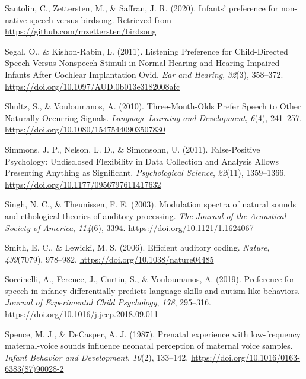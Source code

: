 \documentclass[man]{apa6}
\begin{document}
\leavevmode\hypertarget{ref-santolin_infants_2020}{}%
Santolin, C., Zettersten, M., \& Saffran, J. R. (2020). Infants' preference for non-native speech versus birdsong. Retrieved from \url{https://github.com/mzettersten/birdsong}

\leavevmode\hypertarget{ref-segal_listening_2011}{}%
Segal, O., \& Kishon-Rabin, L. (2011). Listening Preference for Child-Directed Speech Versus Nonspeech Stimuli in Normal-Hearing and Hearing-Impaired Infants After Cochlear Implantation Ovid. \emph{Ear and Hearing}, \emph{32}(3), 358--372. \url{https://doi.org/10.1097/AUD.0b013e3182008afc}

\leavevmode\hypertarget{ref-shultz_three-month-olds_2010}{}%
Shultz, S., \& Vouloumanos, A. (2010). Three-Month-Olds Prefer Speech to Other Naturally Occurring Signals. \emph{Language Learning and Development}, \emph{6}(4), 241--257. \url{https://doi.org/10.1080/15475440903507830}

\leavevmode\hypertarget{ref-simmons_false-positive_2011}{}%
Simmons, J. P., Nelson, L. D., \& Simonsohn, U. (2011). False-Positive Psychology: Undisclosed Flexibility in Data Collection and Analysis Allows Presenting Anything as Significant. \emph{Psychological Science}, \emph{22}(11), 1359--1366. \url{https://doi.org/10.1177/0956797611417632}

\leavevmode\hypertarget{ref-singh_modulation_2003}{}%
Singh, N. C., \& Theunissen, F. E. (2003). Modulation spectra of natural sounds and ethological theories of auditory processing. \emph{The Journal of the Acoustical Society of America}, \emph{114}(6), 3394. \url{https://doi.org/10.1121/1.1624067}

\leavevmode\hypertarget{ref-smith_efficient_2006}{}%
Smith, E. C., \& Lewicki, M. S. (2006). Efficient auditory coding. \emph{Nature}, \emph{439}(7079), 978--982. \url{https://doi.org/10.1038/nature04485}

\leavevmode\hypertarget{ref-sorcinelli_preference_2019}{}%
Sorcinelli, A., Ference, J., Curtin, S., \& Vouloumanos, A. (2019). Preference for speech in infancy differentially predicts language skills and autism-like behaviors. \emph{Journal of Experimental Child Psychology}, \emph{178}, 295--316. \url{https://doi.org/10.1016/j.jecp.2018.09.011}

\leavevmode\hypertarget{ref-spence_prenatal_1987}{}%
Spence, M. J., \& DeCasper, A. J. (1987). Prenatal experience with low-frequency maternal-voice sounds influence neonatal perception of maternal voice samples. \emph{Infant Behavior and Development}, \emph{10}(2), 133--142. \url{https://doi.org/10.1016/0163-6383(87)90028-2}
\end{document}
